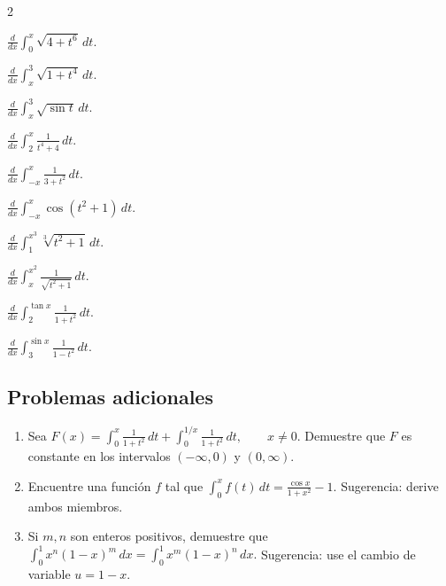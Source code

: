 \documentclass[12pt]{article}
\begin{document}
\begin{enumerate}[resume]
\begin{multicols}{2}
\item $\frac{d}{dx}\int_0^x\sqrt{4+t^6}\,dt$.

\item $\frac{d}{dx}\int_x^3\sqrt{1+t^4}\,dt$.

\item $\frac{d}{dx}\int_x^3\sqrt{\sin t}\,dt.$

\item $\frac{d}{dx}\int_2^x\frac{1}{t^4+4}\,dt.$

\item $\frac{d}{dx}\int_{-x}^{x}\frac{1}{3+t^2}\,dt.$

\item $\frac{d}{dx}\int_{-x}^{x}\cos(t^2+1)\,dt.$

\item $\frac{d}{dx}\int_1^{x^3}\sqrt[3]{t^2+1}\,dt.$

\item $\frac{d}{dx}\int_x^{x^2}\frac{1}{\sqrt{t^2+1}}\,dt.$

\item $\frac{d}{dx}\int_2^{\tan x}\frac{1}{1+t^2}\,dt.$

\item $\frac{d}{dx}\int_3^{\sin x}\frac{1}{1-t^2}\,dt.$
\end{multicols}
\end{enumerate}
\subsection{Problemas adicionales}
\begin{enumerate}
\item Sea $F(x)=\int_0^x\frac{1}{1+t^2}\,dt+\int_0^{1/x}\frac{1}{1+t^2}\,dt,\qquad x\ne0.$ Demuestre que $F$ es constante en los intervalos $(-\infty,0)$ y $(0,\infty)$.

\item Encuentre una función $f$ tal que $\int_0^x f(t)\,dt=\frac{\cos x}{1+x^2}-1.$
Sugerencia: derive ambos miembros.

\item Si $m,n$ son enteros positivos, demuestre que $\int_0^1x^n(1-x)^m\,dx=\int_0^1x^m(1-x)^n\,dx.$ Sugerencia: use el cambio de variable $u=1-x$.
\end{enumerate}
\end{document}
